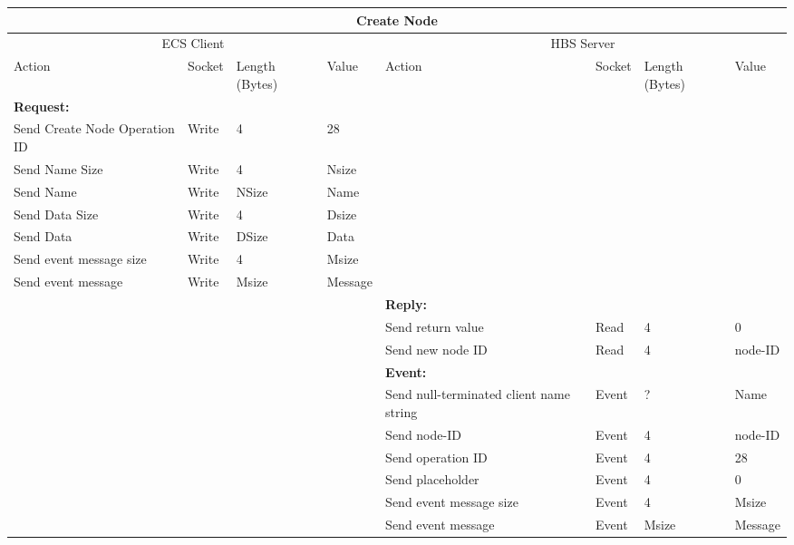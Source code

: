 \bigskip
\small
\begin{tabular}{|p{1.2in}|p{.4in}|p{.4in}|p{.5in}|p{1.2in}|p{.4in}|p{.4in}|p{.5in} |} \hline
\multicolumn{8}{|c|}{{\bf Create Node}} \\ \hline
\multicolumn{4}{|c|}{ECS Client} & \multicolumn{4}{|c|}{HBS Server} \\ \hline
Action            & Socket & Length  
                            (Bytes)& Value & Action       & Socket & Length 
                                                                    (Bytes)& Value \\ \hline
\multicolumn{4}{|l}{{\bf Request:}}&\multicolumn{4}{|l|}{~} \\ \hline
Send Create Node Operation ID  & Write  & 4     & 28    &              &        &       &       \\ \hline
Send Name Size    & Write  & 4     &  Nsize &        &        &       &       \\ \hline
Send Name         & Write  &  NSize &  Name &   &        &       &       \\ \hline
Send Data Size    & Write  & 4     &  Dsize &        &        &       &       \\ \hline
Send Data         & Write  &  DSize &  Data &   &        &       &       \\ \hline
Send event
message size      & Write  & 4     &  Msize &         &        &       &       \\ \hline
Send event message
                  & Write  &  Msize  &  Message &     &        &       &       \\ \hline
\multicolumn{4}{|l}{~}&\multicolumn{4}{|l|}{{\bf Reply:}} \\ \hline
                  &        &       &       & Send return
                                             value        & Read   &  4    & 0      \\ \hline
                  &        &       &       & Send new node ID & Read &  4    &  node-ID \\ \hline
\multicolumn{4}{|l}{~}&\multicolumn{4}{|l|}{{\bf Event:}} \\ \hline
                  &        &       &       & Send null-terminated client
                                             name string  & Event  &  ?    & Name  \\ \hline
                  &        &       &       & Send node-ID  & Event  &   4   &   node-ID    \\  \hline
                  &        &       &       & Send operation 
                                             ID           & Event  &   4   &  28   \\ \hline
                  &        &       &       & Send placeholder     & Event  &   4   &  0    \\ \hline
                  &        &       &       & Send event message
                                                  size    & Event  &   4   &  Msize \\ \hline
                  &        &       &       & Send event message
                                                          & Event  &  Msize&  Message  \\ \hline
\end{tabular}
